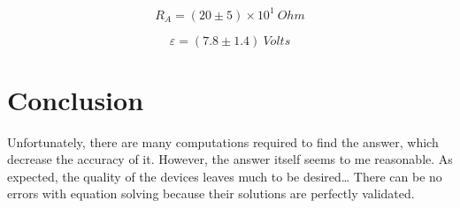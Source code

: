 \documentclass[12pt]{memoir}
\begin{document}
    \begin{equation*}
        R_A = (20 \pm 5) \times 10^1 ~Ohm
    \end{equation*}

    \begin{equation*}
        \varepsilon = (7.8 \pm 1.4) ~Volts
    \end{equation*}


    \section{Conclusion}\label{sec:conclusion}
    Unfortunately, there are many computations required to find the answer, which decrease the accuracy of it.\newline
    However, the answer itself seems to me reasonable.\newline
    As expected, the quality of the devices leaves much to be desired\ldots\newline
    There can be no errors with equation solving because their solutions are perfectly validated.
\end{document}
